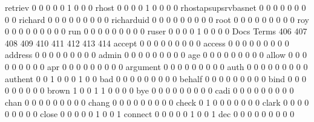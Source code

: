 \documentclass[compress,8pt]{beamer}
\begin{document}
\begin{frame}
\begin{Schunk}
  retriev                                    0   0   0   0   0   1   0   0   0
  rhost                                      0   0   0   0   1   0   0   0   0
  rhostapsupsrvbasnet                        0   0   0   0   0   0   0   0   0
  richard                                    0   0   0   0   0   0   0   0   0
  richarduid                                 0   0   0   0   0   0   0   0   0
  root                                       0   0   0   0   0   0   0   0   0
  roy                                        0   0   0   0   0   0   0   0   0
  run                                        0   0   0   0   0   0   0   0   0
  ruser                                      0   0   0   0   1   0   0   0   0
                                          Docs
Terms                                      406 407 408 409 410 411 412 413 414
  accept                                     0   0   0   0   0   0   0   0   0
  access                                     0   0   0   0   0   0   0   0   0
  address                                    0   0   0   0   0   0   0   0   0
  admin                                      0   0   0   0   0   0   0   0   0
  age                                        0   0   0   0   0   0   0   0   0
  allow                                      0   0   0   0   0   0   0   0   0
  apr                                        0   0   0   0   0   0   0   0   0
  argument                                   0   0   0   0   0   0   0   0   0
  auth                                       0   0   0   0   0   0   0   0   0
  authent                                    0   0   1   0   0   0   1   0   0
  bad                                        0   0   0   0   0   0   0   0   0
  behalf                                     0   0   0   0   0   0   0   0   0
  bind                                       0   0   0   0   0   0   0   0   0
  brown                                      1   0   0   1   1   0   0   0   0
  bye                                        0   0   0   0   0   0   0   0   0
  cadi                                       0   0   0   0   0   0   0   0   0
  chan                                       0   0   0   0   0   0   0   0   0
  chang                                      0   0   0   0   0   0   0   0   0
  check                                      0   1   0   0   0   0   0   0   0
  clark                                      0   0   0   0   0   0   0   0   0
  close                                      0   0   0   0   0   1   0   0   1
  connect                                    0   0   0   0   0   1   0   0   1
  dec                                        0   0   0   0   0   0   0   0   0

\end{Schunk}
\end{frame}
\end{document}
